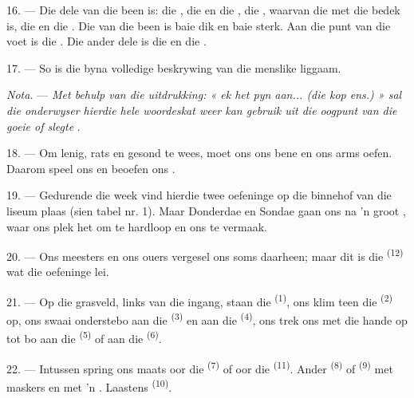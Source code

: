 16. --- Die dele van die been is: die , die  en die
, die , waarvan die  met die 
bedek is, die  en die . Die  van die been is
baie dik en baie sterk. Aan die punt van die voet is die . Die ander dele
is die  en die .

17. --- So is die byna volledige beskrywing van die menslike liggaam.

\textit{Nota.} --- \textit{Met behulp van die uitdrukking: « ek het pyn aan... (die kop
ens.) » sal die onderwyser hierdie hele woordeskat weer kan gebruik uit die oogpunt van
die goeie of slegte} .

\VUsaut{5.0mm}
\VUsaut{2.4mm}
\VUsaut{3.0mm}

18. --- Om lenig, rats en gesond te wees, moet ons ons bene en ons arms oefen. Daarom
speel ons en beoefen ons .

19. --- Gedurende die week vind hierdie twee oefeninge op die binnehof van die liseum
plaas (sien tabel nr. 1). Maar Donderdae en Sondae gaan ons na 'n groot ,
waar ons plek het om te hardloop en ons te vermaak.

20. --- Ons meesters en ons ouers vergesel ons soms daarheen; maar dit is die
\textsuperscript{(12)} wat die oefeninge lei.

21. --- Op die grasveld, links van die ingang, staan die 
\textsuperscript{(1)}, ons klim teen die \textsuperscript{(2)} op, ons
swaai onderstebo aan die \textsuperscript{(3)} en aan die
\textsuperscript{(4)}, ons trek ons met die hande op tot bo aan die
\textsuperscript{(5)} of aan die \textsuperscript{(6)}.

22. --- Intussen spring ons maats oor die \textsuperscript{(7)} of oor
die \textsuperscript{(11)}. Ander
\textsuperscript{(8)} of \textsuperscript{(9)} met maskers en
met 'n . Laastens \textsuperscript{(10)}.

\VUsaut{4.6mm}
\VUsaut{3.0mm}

